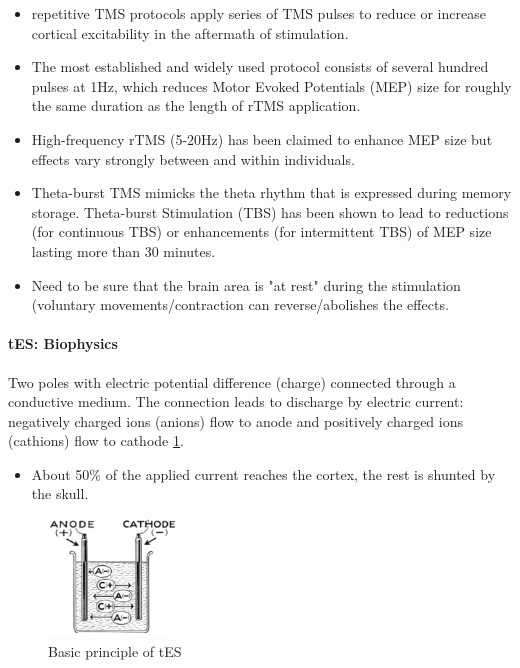 \documentclass[12pt,article,oneside,a4paper]{memoir}
\begin{document}
\begin{itemize}
\item repetitive TMS protocols apply series of TMS pulses to reduce or increase cortical excitability in the aftermath of stimulation.
\item The most established and widely used protocol consists of several hundred pulses at 1Hz, which reduces Motor Evoked Potentials (MEP) size for roughly the same duration as the length of rTMS application.
\item High-frequency rTMS (5-20Hz) has been claimed to enhance MEP size but effects
vary strongly between and within individuals.
\item Theta-burst TMS mimicks the theta rhythm that is expressed during memory
storage.
\subitem Theta-burst Stimulation (TBS) has been shown to lead to reductions (for continuous TBS) or enhancements (for intermittent TBS) of MEP size lasting more than 30 minutes.
\item Need to be sure that the brain area is "at rest" during the stimulation (voluntary movements/contraction can reverse/abolishes the effects.
\end{itemize}

\paragraph{tES: Biophysics} Two poles with electric potential difference (charge) connected through a conductive medium. The connection leads to discharge by electric current: negatively charged ions (anions) flow to anode and positively charged ions (cathions) flow to cathode \ref{fig:tes}. 

\begin{itemize}
\item About 50\% of the applied current reaches the cortex, the rest is shunted by the skull.
\end{itemize}

\begin{figure}
  \centering
  \includegraphics[width=0.3\textwidth]{imgs/tes.png}
  \caption{Basic principle of tES}
  \label{fig:tes}
\end{figure}
\end{document}
